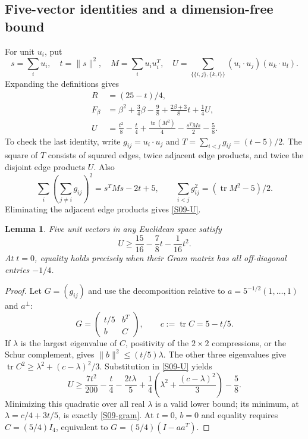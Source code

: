 \documentclass[11pt,a4paper]{article}
\newtheorem{lemma}[theorem]{Lemma}
\theoremstyle{definition}\newtheorem{definition}[theorem]{Definition}
\theoremstyle{remark}\newtheorem{remark}[theorem]{Remark}
\DeclareMathOperator{\tr}{tr}\DeclareMathOperator{\supp}{supp}\DeclareMathOperator{\TV}{TV}
\numberwithin{equation}{section}
\begin{document}
\subsection{Five-vector identities and a dimension-free bound}\label{S09-sec-3}
For unit $u_i$, put
\[
 s=\sum_i u_i,\quad t=\|s\|^2,\quad M=\sum_i u_i u_i^T,\quad
 U=\sum_{\{\{i,j\},\{k,l\}\}}(u_i\cdot u_j)(u_k\cdot u_l).
\]
Expanding the definitions gives
\begin{align}
 R&=(25-t)/4,\label{S09-R}\\
 F_\beta&=\beta^2+\tfrac34\beta-\tfrac98
       +\tfrac{2\beta+3}{8}t+\tfrac14U,\label{S09-F}\\
 U&=\frac{t^2}{8}-\frac t4+\frac{\tr(M^2)}4
       -\frac{s^TMs}{2}-\frac58.\label{S09-U}
\end{align}
To check the last identity, write $g_{ij}=u_i\cdot u_j$ and $T=\sum_{i<j}g_{ij}=(t-5)/2$. The square of $T$ consists of squared edges, twice adjacent edge products, and twice the disjoint edge products $U$. Also
\[
 \sum_i\left(\sum_{j\ne i}g_{ij}\right)^2
 =s^TMs-2t+5,\qquad
 \sum_{i<j}g_{ij}^2=(\tr M^2-5)/2.
\]
Eliminating the adjacent edge products gives \eqref{S09-U}.
\begin{lemma}\label{S09-fivegram}
Five unit vectors in any Euclidean space satisfy
\begin{equation}\label{S09-gram}
 U\ge\frac{15}{16}-\frac78t-\frac1{16}t^2.
\end{equation}
At $t=0$, equality holds precisely when their Gram matrix has all off-diagonal entries $-1/4$.
\end{lemma}
\begin{proof}
Let $G=(g_{ij})$ and use the decomposition relative to $a=5^{-1/2}(1,\ldots,1)$ and $a^\perp$:
\[
 G=\begin{pmatrix}t/5&b^T\\b&C\end{pmatrix},\qquad
 c:=\tr C=5-t/5.
\]
If $\lambda$ is the largest eigenvalue of $C$, positivity of the $2\times2$ compressions, or the Schur complement, gives $\|b\|^2\le(t/5)\lambda$. The other three eigenvalues give
$\tr C^2\ge\lambda^2+(c-\lambda)^2/3$. Substitution in \eqref{S09-U} yields
\[
 U\ge\frac{7t^2}{200}-\frac t4-\frac{2t\lambda}{5}
       +\frac14\left(\lambda^2+\frac{(c-\lambda)^2}{3}\right)-\frac58.
\]
Minimizing this quadratic over all real $\lambda$ is a valid lower bound; its minimum, at $\lambda=c/4+3t/5$, is exactly \eqref{S09-gram}. At $t=0$, $b=0$ and equality requires $C=(5/4)I_4$, equivalent to $G=(5/4)(I-aa^T)$.
\end{proof}
\end{document}
